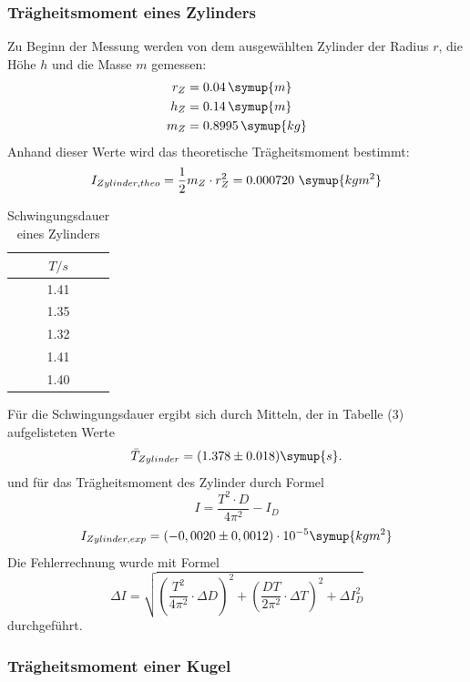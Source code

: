 \subsubsection{Trägheitsmoment eines Zylinders}
Zu Beginn der Messung werden von dem ausgewählten Zylinder der Radius $r$,
die Höhe $h$ und die Masse $m$ gemessen:
\begin{align*}
r_Z &= 0.04 \, \symup{m} \\ %
h_Z &= 0.14  \, \symup{m} \\
m_Z &= 0.8995 \, \symup{kg}
\end{align*}
Anhand dieser Werte wird das theoretische Trägheitsmoment bestimmt:
\begin{equation*}
I_{Zylinder,theo} = \frac{1}{2} m_Z \cdot r_Z^2 = 0.000720 \,\, \symup{kg m^2}
\end{equation*}
\begin{table}[H]
  \centering
  \label{tab:zyl}
  \caption{Schwingungsdauer eines Zylinders}
  \begin{tabular}{c }
    \toprule
     $T/s$ \\
    \midrule
      1.41 \\
      1.35 \\
      1.32 \\
      1.41 \\
     1.40 \\
    \bottomrule
  \end{tabular}
\end{table}
Für die Schwingungsdauer ergibt sich durch Mitteln,
der in Tabelle (3) aufgelisteten Werte
\begin{equation*}
\bar{T}_{Zylinder} = (1.378 \pm 0.018) \symup{s}.
\end{equation*}
und für das Trägheitsmoment des Zylinder durch Formel
\begin{equation}
  I = \frac{T^2\cdot D}{4\pi ^2}-I_D
  \label{eqn:träg}
\end{equation}
\begin{equation*}
I_{Zylinder,exp} = (-0,0020 \pm 0,0012)  \cdot 10^{-5}\symup{kg m^2} %
\end{equation*}
Die Fehlerrechnung wurde mit Formel
\begin{equation}
  \Delta I = \sqrt{\left(\frac{T^2}{4\pi^2}\cdot \Delta D\right)^2
  +\left(\frac{DT}{2\pi^2}\cdot \Delta T\right)^2 + \Delta I_D^2}
  \label{eqn:fehler}
\end{equation}
durchgeführt.
\subsubsection{Trägheitsmoment einer Kugel}

